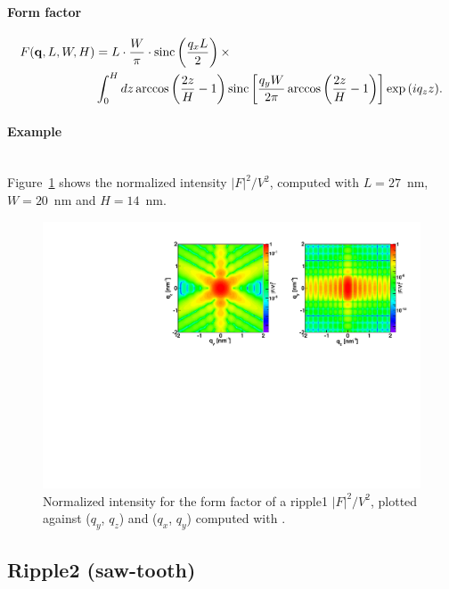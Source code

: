 \paragraph{Form factor}
\begin{align*}
F(\mathbf{q},L,W,H) &=L \cdot \frac{W}{\pi}\cdot \operatorname{sinc}\left(\frac{q_xL}{2}\right)\times \\ &\int_0^H{dz \arccos\left(\frac{2z}{H}-1\right)\operatorname{sinc}\left[\frac{q_yW}{2\pi}\arccos\left(\frac{2z}{H} - 1\right)\right]\exp\left(iq_zz\right)}.
\end{align*}


\paragraph{Example}\strut\\
Figure~\ref{fig:FFripple1Ex} shows the normalized intensity
$|F|^2/V^2$, computed with $L=27$~nm, $W=20$~nm and $H=14$~nm.

\begin{figure}[h]
\begin{center}
\includegraphics[angle=-90,width=\textwidth]{fig/ff/figffripple1.pdf}
\end{center}
\caption{Normalized intensity for the form factor of a ripple1
  $|F|^2/V^2$, plotted against ($q_y$, $q_z$) and  ($q_x$, $q_y$)
  computed with .}
\label{fig:FFripple1Ex}
\end{figure}


\clearpage
\subsection{Ripple2 (saw-tooth)} \label{sec:Ripple2}  

